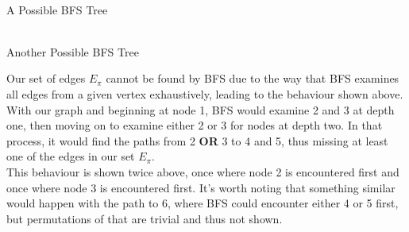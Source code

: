 \documentclass[12pt]{article}
\begin{document}
\begin{enumerate}
\begin{minipage}{0.4\textwidth}
\begin{center}
 \\
                A Possible BFS Tree
              \end{center}
            \end{minipage}
            \hfill
            \begin{minipage}{0.4\textwidth}
              \begin{center}
                 \\
                Another Possible BFS Tree
              \end{center}
            \end{minipage}
            
    \vspace{7mm}        
    Our set of edges $E_{\pi}$ cannot be found by BFS due to the way that BFS examines all edges from a given vertex exhaustively, leading to the behaviour 
shown above. With our graph and beginning at node 1, BFS would examine 2 and 3 at depth one, then moving on to examine either 2 or 3 for nodes at depth two. 
In that process, it would find the paths from 2 {\bf OR} 3 to 4 and 5, thus missing at least one of the edges in our set $E_{\pi}$. \\
    
    This behaviour is shown twice above, once where node 2 is encountered first and once where node 3 is encountered first. It's worth noting that something 
similar would happen with the path to 6, where BFS could encounter either 4 or 5 first, but permutations of that are trivial and thus not shown.


\end{enumerate}
\end{document}
